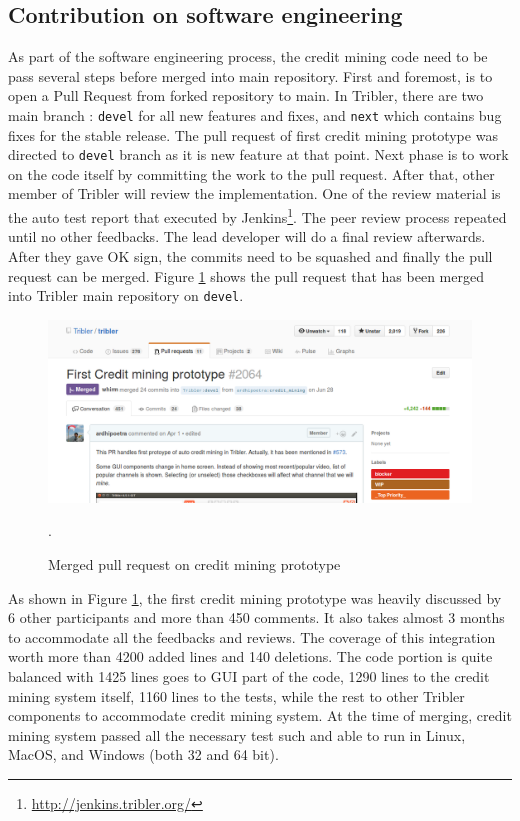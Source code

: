 \subsection{Contribution on software engineering}
As part of the software engineering process, the credit mining code need to be pass several steps before merged into main repository. First and foremost, is to open a Pull Request from forked repository to main. In Tribler, there are two main branch : \texttt{devel} for all new features and fixes, and \texttt{next} which contains bug fixes for the stable release. The pull request of first credit mining prototype was directed to \texttt{devel} branch as it is new feature at that point. Next phase is to work on the code itself by committing the work to the pull request. After that, other member of Tribler will review the implementation. One of the review material is the auto test report that executed by Jenkins\footnote{\url{http://jenkins.tribler.org/}}. The peer review process repeated until no other feedbacks. The lead developer will do a final review afterwards. After they gave OK sign, the commits need to be squashed and finally the pull request can be merged. Figure \ref{fig:cmpullrequest} shows the pull request that has been merged into Tribler main repository on \texttt{devel}.

\begin{figure}[h]
	\centering
	\includegraphics[width=\textwidth]{pics/cm_pr_crop.png}
	\caption[Merged pull request on credit mining prototype]{Merged pull request on credit mining prototype\footnotemark}.
	\label{fig:cmpullrequest}
\end{figure}

As shown in Figure \ref{fig:cmpullrequest}, the first credit mining prototype was heavily discussed by 6 other participants and more than 450 comments. It also takes almost 3 months to accommodate all the feedbacks and reviews. The coverage of this integration worth more than 4200 added lines and 140 deletions. The code portion is quite balanced with 1425 lines goes to GUI part of the code, 1290 lines to the credit mining system itself, 1160 lines to the tests, while the rest to other Tribler components to accommodate credit mining system. At the time of merging, credit mining system passed all the necessary test such and able to run in Linux, MacOS, and Windows (both 32 and 64 bit).

